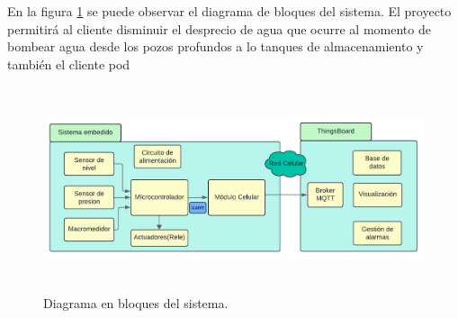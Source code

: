 \documentclass[
11pt, %
codirector, %
]{charter}
\begin{document}
En la figura \ref{fig:diagra_sistema} se puede observar el diagrama de bloques del sistema.
El proyecto permitirá al cliente disminuir el desprecio de agua que ocurre al momento de bombear agua desde los pozos profundos a lo tanques de almacenamiento y también el cliente pod 

\begin{figure}[hpb]
	\centering 
	\includegraphics[width=12cm, height=6cm]{./Figuras/d_sistema.png}
	\caption{Diagrama en bloques del sistema.}
	\label{fig:diagra_sistema}
\end{figure}
\end{document}
